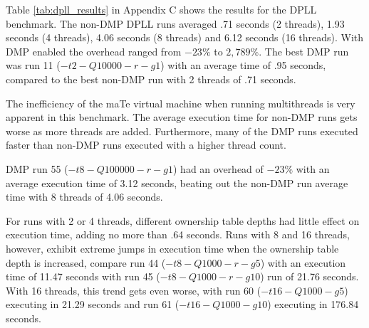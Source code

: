 Table \ref{tab:dpll_results} in Appendix C shows the results for the
DPLL benchmark.  The non-DMP DPLL runs averaged .71 seconds (2
threads), 1.93 seconds (4 threads), 4.06 seconds (8 threads) and 6.12
seconds (16 threads).  With DMP enabled the overhead ranged from
$-23\%$ to $2,789\%$.  The best DMP run was run 11 ($-t2 -Q10000 -r
-g1$) with an average time of .95 seconds, compared to the best
non-DMP run with 2 threads of .71 seconds.

The inefficiency of the maTe virtual machine when running multithreads
is very apparent in this benchmark.  The average execution time for
non-DMP runs gets worse as more threads are added.  Furthermore, many
of the DMP runs executed faster than non-DMP runs executed with a
higher thread count.

DMP run 55 ($-t8 -Q100000 -r -g1$) had an overhead of $-23\%$ with an
average execution time of 3.12 seconds, beating out the non-DMP run
average time with 8 threads of 4.06 seconds.

For runs with 2 or 4 threads, different ownership table depths had
little effect on execution time, adding no more than .64 seconds.
Runs with 8 and 16 threads, however, exhibit extreme jumps in
execution time when the ownership table depth is increased, compare
run 44 ($-t8 -Q1000 -r -g5$) with an execution time of 11.47 seconds
with run 45 ($-t8 -Q1000 -r -g10$) run of 21.76 seconds.  With 16
threads, this trend gets even worse, with run 60 ($-t16 -Q1000 -g5$)
executing in 21.29 seconds and run 61 ($-t16 -Q1000 -g10$) executing
in 176.84 seconds.

